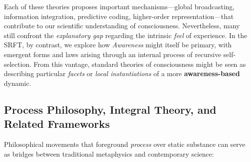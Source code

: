 \documentclass[12pt,a4paper]{article}
\begin{document}
Each of these theories proposes important mechanisms—global broadcasting, information integration, predictive coding, higher-order representation—that contribute to our scientific understanding of consciousness. Nevertheless, many still confront the \emph{explanatory gap} regarding the intrinsic \emph{feel} of experience. In the SRFT, by contrast, we explore how \emph{Awareness} might itself be primary, with emergent forms and laws arising through an internal process of recursive self-selection. From this vantage, standard theories of consciousness might be seen as describing particular \emph{facets} or \emph{local instantiations} of a more \textbf{awareness-based} dynamic.

\subsection{Process Philosophy, Integral Theory, and Related Frameworks}
\label{subsec:process-integral}

Philosophical movements that foreground \emph{process} over static substance can serve as bridges between traditional metaphysics and contemporary science:
\end{document}
